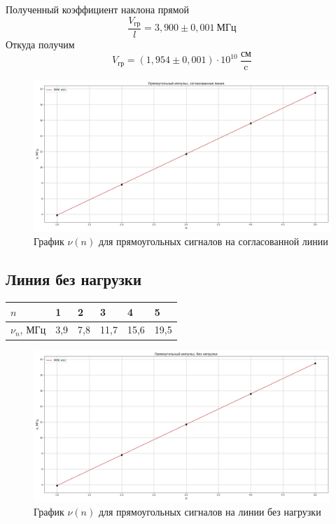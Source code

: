 \documentclass[a4paper,12pt]{article}
\theoremstyle{definition}
\begin{document}
	Полученный коэффициент наклона прямой
	$$\frac{V_\text{гр}}{l}=3,900\pm0,001\:\text{МГц}$$
	Откуда получим
	$$V_\text{гр}=(1,954\pm0,001)\cdot10^{10}\:\frac{\text{см}}{\text{c}}$$

	\begin{figure}[h]
		\centering
		\includegraphics[scale=0.38]{graph31.png}
		\caption{График $\nu(n)$ для прямоугольных сигналов на согласованной линии}
	\end{figure}
	

	\subsection{Линия без нагрузки}
 	\begin{table}[h!]
		\begin{center}
 		\begin{tabular}{|l|l|l|l|l|l|} \hline
 			$n$          & 1   & 2   & 3    & 4    & 5    \\ \hline
 			$\nu_n$, МГц & 3,9 & 7,8 & 11,7 & 15,6 & 19,5 \\ \hline
 		\end{tabular}
		\end{center}
 	\end{table}
 	
	\begin{figure}[h]
		\centering
		\includegraphics[scale=0.38]{graph32.png}
		\caption{График $\nu(n)$ для прямоугольных сигналов на линии без нагрузки}
	\end{figure}
\end{document}
